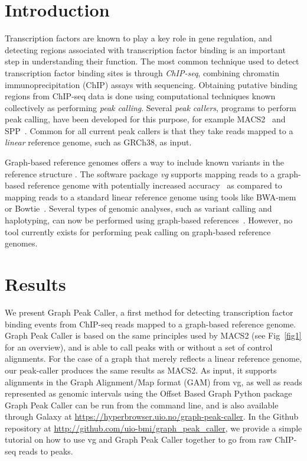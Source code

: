 \documentclass[10pt,letterpaper]{article}
\begin{document}
\section*{Introduction}
Transcription factors are known to play a key role in gene regulation, and detecting regions associated with transcription factor binding is an important step in understanding their function. The most common technique used to detect transcription factor binding sites is through \emph{ChIP-seq}, combining chromatin immunoprecipitation (ChIP) assays with sequencing. Obtaining putative binding regions from ChIP-seq data is done using computational techniques known collectively as performing \emph{peak calling}. Several \emph{peak callers}, programs to perform peak calling, have been developed for this purpose, for example MACS2~\cite{macs} and SPP~\cite{spp}. Common for all current peak callers is that they take reads mapped to a \emph{linear} reference genome, such as GRCh38, as input. 

Graph-based reference genomes offers a way to include known variants in the reference structure \cite{graph_evolution}. The software package \emph{vg} supports mapping reads to a graph-based reference genome with potentially increased accuracy~\cite{vg, genome_graphs} as compared to mapping reads to a standard linear reference genome using tools like BWA-mem~\cite{bwa_mem} or Bowtie~\cite{bowtie}. Several types of genomic analyses, such as variant calling and haplotyping, can now be performed using graph-based references~\cite{vg, genome_graphs}. However, no tool currently exists for performing peak calling on graph-based reference genomes. 

\section*{Results}
We present Graph Peak Caller, a first method for detecting transcription factor binding events from ChIP-seq reads mapped to a graph-based reference genome. Graph Peak Caller is based on the same principles used by MACS2 (see Fig~\ref{fig1} for an overview), and  is able to call peaks with or without a set of control alignments. For the case of a graph that merely reflects a linear reference genome, our peak-caller produces the same results as MACS2. As input, it supports alignments in the Graph Alignment/Map format (GAM) from vg, as well as reads represented as genomic intervals using the Offset Based Graph Python package~\cite{rand} Graph Peak Caller can be run from the command line, and is also available through Galaxy at \url{https://hyperbrowser.uio.no/graph-peak-caller}. In the Github repository at \url{http://github.com/uio-bmi/graph_peak_caller}, we provide a simple tutorial on how to use vg and Graph Peak Caller together to go from raw ChIP-seq reads to peaks. 
\end{document}
